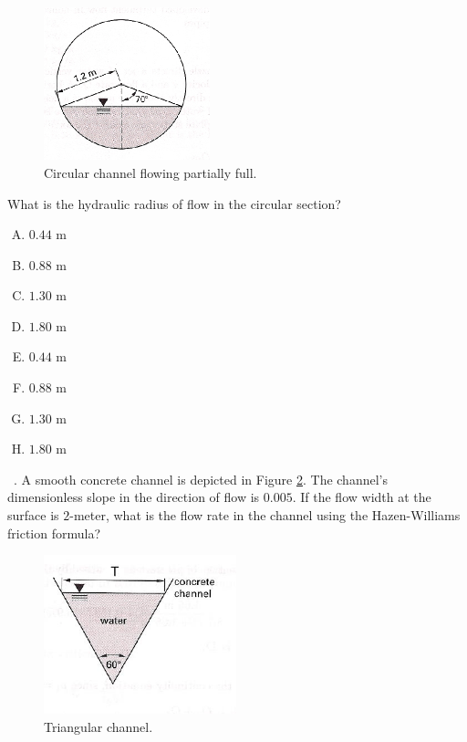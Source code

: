 \documentclass[11pt]{article}
\begin{document}
\begin{enumerate}
\begin{figure}[h!] %
\centering
   \includegraphics[width=1.9in]{CircularSewerToo.jpg}
   \caption{Circular channel flowing partially full.}
   \label{fig:CircularSewerToo} 
\end{figure}

What is the hydraulic radius of flow in the circular section?
\begin{enumerate} [(A)]
\item $0.44$ m
\item $0.88$ m
\item $1.30$ m
\item $1.80$ m
\item $0.44$ m
\item $0.88$ m
\item $1.30$ m
\item $1.80$ m
\end{enumerate}
~. A smooth concrete channel is depicted in Figure \ref{fig:TriangleChannel}.  The channel's dimensionless slope in the direction of flow is $0.005$.  If the flow width at the surface is $2$-meter, what is the flow rate in the channel using the Hazen-Williams friction formula?

\begin{figure}[h!] %
\centering
   \includegraphics[width=2.2in]{TriangleChannel.jpg}
   \caption{Triangular channel.}
   \label{fig:TriangleChannel} 
\end{figure}


\end{enumerate}
\end{document}
